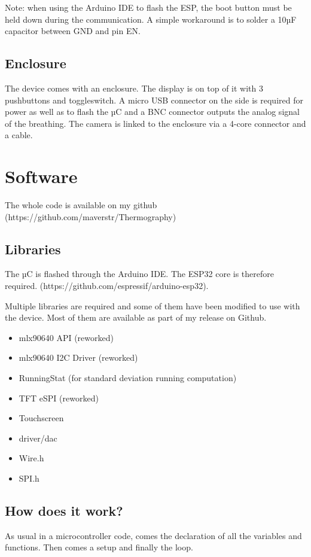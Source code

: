\documentclass[a4paper]{article}
\begin{document}
Note: when using the Arduino IDE to flash the ESP, the boot button must be held down during the communication. A simple workaround is to solder a 10µF capacitor between GND and pin EN.


\subsection{Enclosure}
The device comes with an enclosure.
The display is on top of it with 3 pushbuttons and toggleswitch. A micro USB connector on the side is required for power as well as to flash the µC and a BNC connector outputs the analog signal of the breathing.
The camera is linked to the enclosure via a 4-core connector and a cable.


\section{Software}
The whole code is available on my github (https://github.com/maverstr/Thermography)

\subsection{Libraries}
The µC is flashed through the Arduino IDE. The ESP32 core is therefore required. (https://github.com/espressif/arduino-esp32).

Multiple libraries are required and some of them have been modified to use with the device. Most of them are available as part of my release on Github.

\begin{itemize}
    \item mlx90640 API (reworked)
    \item mlx90640 I2C Driver (reworked)
    \item RunningStat (for standard deviation running computation)
    \item TFT eSPI (reworked)
    \item Touchscreen
    \item driver/dac
    \item Wire.h
    \item SPI.h
\end{itemize}


\subsection{How does it work?}
As usual in a microcontroller code, comes the declaration of all the variables and functions. Then comes a setup and finally the loop.
\end{document}

